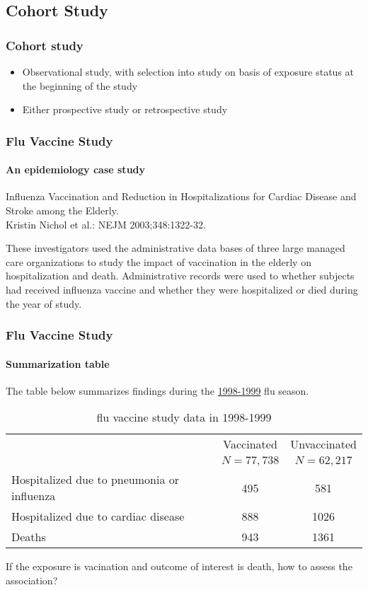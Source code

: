 \documentclass[table,10pt]{beamer}
\begin{document}
\begin{CJK*}{UTF8}{gbsn}
\section{Cohort Study}

\begin{frame}[t]
\frametitle{Cohort study}
\begin{itemize}
	\item Observational study, with selection into study on basis of exposure 
		status at the beginning of the study
	\item Either prospective study or retrospective study
\end{itemize}
\end{frame}


\begin{frame}
\frametitle{Flu Vaccine Study}
\framesubtitle{An epidemiology case study}
{\large \alert{Influenza Vaccination and Reduction in Hospitalizations
for Cardiac Disease and Stroke among the Elderly.}}\\
\small{Kristin Nichol et al.: NEJM 2003;348:1322-32.}

These investigators used the administrative data bases
of three large managed care organizations to study the
impact of vaccination in the elderly on hospitalization
and death. Administrative records were used to whether
subjects had received influenza vaccine and whether
they were hospitalized or died during the year of study.
\end{frame}


\begin{frame}[t]
\frametitle{Flu Vaccine Study}
\framesubtitle{Summarization table}
The table below summarizes findings during the \underline{1998-1999} flu season.
\begin{table}
\renewcommand\arraystretch{1.2}
\footnotesize
\caption{flu vaccine study data in 1998-1999}
\begin{tabular}{p{3cm}cc}
\hline
& Vaccinated & Unvaccinated\\
& $N=77,738$ & $N=62,217$ \\
\hline
Hospitalized due to pneumonia or influenza & 495 & 581\\
\hline
Hospitalized due to cardiac disease & 888 & 1026\\
\hline
Deaths & 943 & 1361\\
\hline
\end{tabular}
\end{table}
\alert{If the exposure is vacination and outcome of interest is death, how to assess the 
association?}
\end{frame}


\end{CJK*}
\end{document}
